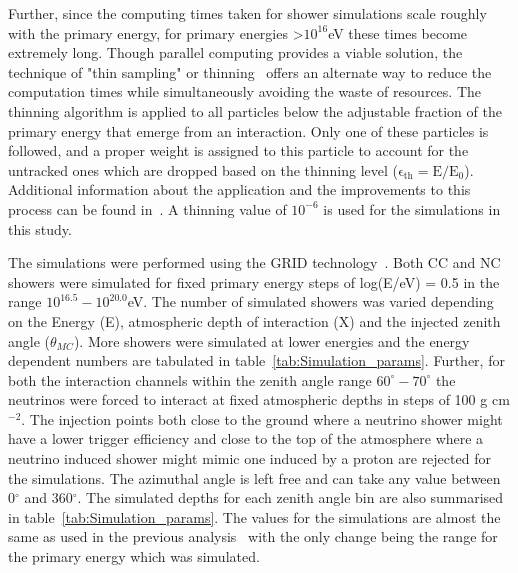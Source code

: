 Further, since the computing times taken for shower simulations scale roughly with the primary energy, for primary energies >$10^{16}$eV these times become extremely long. Though parallel computing provides a viable solution, the technique of "thin sampling" or thinning~\cite{Hillas:1997tf} offers an alternate way to reduce the computation times while simultaneously avoiding the waste of resources. The thinning algorithm is applied to all particles below the adjustable fraction of the primary energy that emerge from an interaction. Only one of these particles is followed, and a proper weight is assigned to this particle to account for the untracked ones which are dropped based on the thinning level ($\mathrm{\epsilon_{th} = E/E_0}$). Additional information about the application and the improvements to this process can be found in~\cite{Heck:1998gr,Kobal:2001jx}. A thinning value of $10^{-6}$ is used for the simulations in this study.


The simulations were performed using the GRID technology~\cite{GRID_tech,LozanoBahilo:2012pe}. Both CC and NC showers were simulated for fixed primary energy steps of log(E/eV) = 0.5 in the range $10^{16.5}-10^{20.0}$eV. The number of simulated showers was varied depending on the Energy (E), atmospheric depth of interaction (X) and the injected zenith angle ($\theta_{MC}$). More showers were simulated at lower energies and the energy dependent numbers are tabulated in table~\ref{tab:Simulation_params}. Further, for both the interaction channels within the zenith angle range $60^{\circ}-70^{\circ}$ the neutrinos were forced to interact at fixed atmospheric depths in steps of 100 g cm$^{-2}$. The injection points both close to the ground where a neutrino shower might have a lower trigger efficiency and close to the top of the atmosphere where a neutrino induced shower might mimic one induced by a proton are rejected for the simulations. The azimuthal angle is left free and can take any value between 0$^{\circ}$ and 360$^{\circ}$. The simulated depths for each zenith angle bin are also summarised in table~\ref{tab:Simulation_params}. The values for the simulations are almost the same as used in the previous analysis~\cite{gap_note_2013} with the only change being the range for the primary energy which was simulated.

